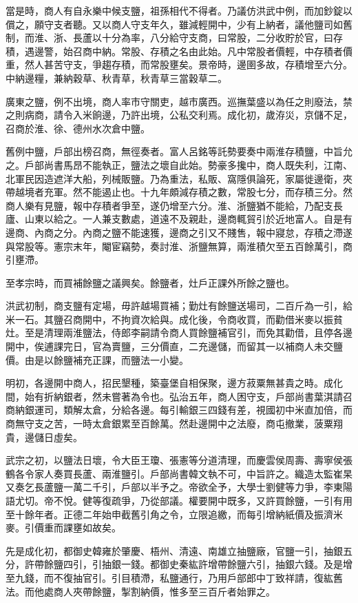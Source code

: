當是時，商人有自永樂中候支鹽，祖孫相代不得者。乃議仿洪武中例，而加鈔錠以償之，願守支者聽。又以商人守支年久，雖減輕開中，少有上納者，議他鹽司如舊制，而淮、浙、長蘆以十分為率，八分給守支商，曰常股，二分收貯於官，曰存積，遇邊警，始召商中納。常股、存積之名由此始。凡中常股者價輕，中存積者價重，然人甚苦守支，爭趨存積，而常股壅矣。景帝時，邊圉多故，存積增至六分。中納邊糧，兼納穀草、秋青草，秋青草三當穀草二。

廣東之鹽，例不出境，商人率市守關吏，越市廣西。巡撫葉盛以為任之則廢法，禁之則病商，請令入米餉邊，乃許出境，公私交利焉。成化初，歲洊災，京儲不足，召商於淮、徐、德州水次倉中鹽。

舊例中鹽，戶部出榜召商，無徑奏者。富人呂銘等託勢要奏中兩淮存積鹽，中旨允之。戶部尚書馬昂不能執正，鹽法之壞自此始。勢豪多攙中，商人既失利，江南、北軍民因造遮洋大船，列械販鹽。乃為重法，私販、窩隱俱論死，家屬徙邊衛，夾帶越境者充軍。然不能遏止也。十九年頗減存積之數，常股七分，而存積三分。然商人樂有見鹽，報中存積者爭至，遂仍增至六分。淮、浙鹽猶不能給，乃配支長廬、山東以給之。一人兼支數處，道遠不及親赴，邊商輒貿引於近地富人。自是有邊商、內商之分。內商之鹽不能速獲，邊商之引又不賤售，報中寢怠，存積之滯遂與常股等。憲宗末年，閹宦竊勢，奏討淮、浙鹽無算，兩淮積欠至五百餘萬引，商引壅滯。

至孝宗時，而買補餘鹽之議興矣。餘鹽者，灶戶正課外所餘之鹽也。

洪武初制，商支鹽有定場，毋許越場買補；勤灶有餘鹽送場司，二百斤為一引，給米一石。其鹽召商開中，不拘資次給與。成化後，令商收買，而勸借米麥以振貧灶。至是清理兩淮鹽法，侍郎李嗣請令商人買餘鹽補官引，而免其勸借，且停各邊開中，俟逋課完日，官為賣鹽，三分價直，二充邊儲，而留其一以補商人未交鹽價。由是以餘鹽補充正課，而鹽法一小變。

明初，各邊開中商人，招民墾種，築臺堡自相保聚，邊方菽粟無甚貴之時。成化間，始有折納銀者，然未嘗著為令也。弘治五年，商人困守支，戶部尚書葉淇請召商納銀運司，類解太倉，分給各邊。每引輸銀三四錢有差，視國初中米直加倍，而商無守支之苦，一時太倉銀累至百餘萬。然赴邊開中之法廢，商屯撤業，菠粟翔貴，邊儲日虛矣。

武宗之初，以鹽法日壞，令大臣王瓊、張憲等分道清理，而慶雲侯周壽、壽寧侯張鶴各令家人奏買長蘆、兩淮鹽引。戶部尚書韓文執不可，中旨許之。織造太監崔杲又奏乞長蘆鹽一萬二千引，戶部以半予之。帝欲全予，大學士劉健等力爭，李東陽語尤切。帝不悅。健等復疏爭，乃從部議。權要開中既多，又許買餘鹽，一引有用至十餘年者。正德二年始申截舊引角之令，立限追繳，而每引增納紙價及振濟米麥。引價重而課壅如故矣。

先是成化初，都御史韓雍於肇慶、梧州、清遠、南雄立抽鹽廠，官鹽一引，抽銀五分，許帶餘鹽四引，引抽銀一錢。都御史秦紘許增帶餘鹽六引，抽銀六錢。及是增至九錢，而不復抽官引。引目積滯，私鹽通行，乃用戶部郎中丁致祥請，復紘舊法。而他處商人夾帶餘鹽，掣割納價，惟多至三百斤者始罪之。

